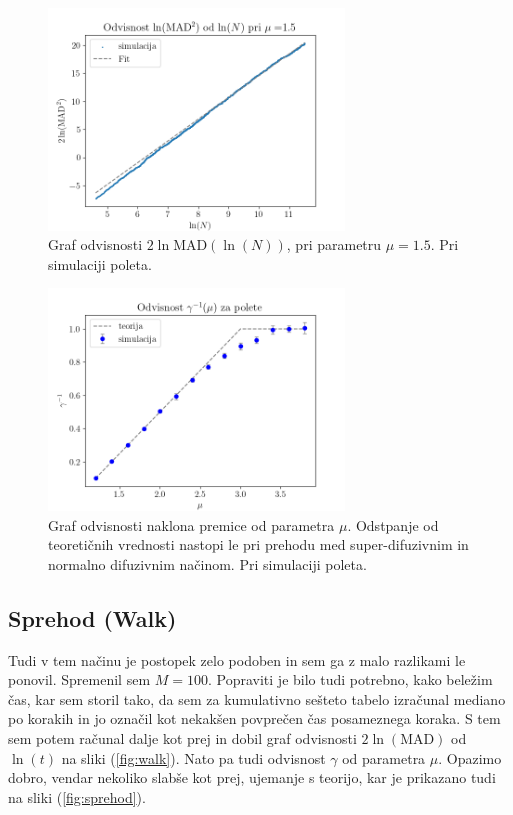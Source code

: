 \documentclass[12pt]{article}
\begin{document}
\begin{figure}
    \centering
    \includegraphics[width=0.7\textwidth]{Flight1_5.png}
    \caption{\label{fig:flight} Graf odvisnosti $2\ln{\mathrm{MAD}}(\ln(N))$, pri parametru $\mu = 1.5$. Pri simulaciji poleta.}
\end{figure}

\begin{figure}
    \centering
    \includegraphics[width=0.7\textwidth]{PoletGammaMu.png}
    \caption{\label{fig:polet} Graf odvisnosti naklona premice od parametra $\mu$. Odstpanje od teoretičnih vrednosti nastopi le pri prehodu med super-difuzivnim in normalno difuzivnim načinom. Pri simulaciji poleta.}
\end{figure}

\subsection*{Sprehod (Walk)}
Tudi v tem načinu je postopek zelo podoben in sem ga z malo razlikami le ponovil. Spremenil sem $M = \num{100}$. Popraviti je bilo tudi potrebno, kako beležim čas, kar sem storil tako, da sem za kumulativno sešteto tabelo izračunal mediano po korakih in jo označil kot nekakšen povprečen čas posameznega koraka. S tem sem potem računal dalje kot prej in dobil graf odvisnosti $2\ln (\mathrm{MAD})$ od $\ln(t)$ na sliki (\ref{fig:walk}). Nato pa tudi odvisnost $\gamma$ od parametra $\mu$. Opazimo dobro, vendar nekoliko slabše kot prej, ujemanje s teorijo, kar je prikazano tudi na sliki (\ref{fig:sprehod}).
\end{document}
